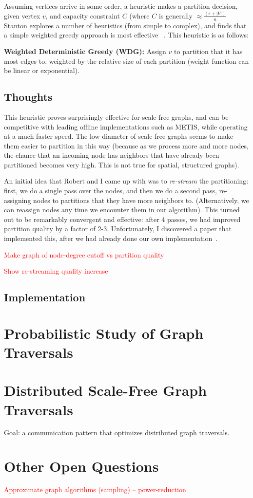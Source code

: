 \documentclass[11pt]{article}
\newcommand\warning[1]{\textcolor{red}{#1}}
\begin{document}
Assuming vertices arrive in some order, a heuristic makes a partition decision, given vertex $v$, and capacity constraint $C$ (where $C$ is generally $\approx \frac{(\epsilon+|V|)}{n}$ Stanton explores a number of heuristics (from simple to complex), and finds that a simple weighted greedy approach is most effective ~\cite{Stanton:2012:SGP:2339530.2339722}. This heuristic is as follows:

\textbf{Weighted Deterministic Greedy (WDG):} Assign $v$ to partition that it has most edges to, weighted by the relative size of each partition (weight function can be linear or exponential).

\subsection{Thoughts}
This heuristic proves surprisingly effective for scale-free graphs, and can be competitive with leading offline implementations such as METIS, while operating at a much faster speed. The low diameter of scale-free graphs seems to make them easier to partition in this way (because as we process more and more nodes, the chance that an incoming node has neighbors that have already been partitioned becomes very high. This is not true for spatial, structured graphs). 

An initial idea that Robert and I came up with was to \textit{re-stream} the partitioning: first, we do a single pass over the nodes, and then we do a second pass, re-assigning nodes to partitions that they have more neighbors to. (Alternatively, we can reassign nodes any time we encounter them in our algorithm). This turned out to be remarkably convergent and effective: after 4 passes, we had improved partition quality by a factor of 2-3. Unfortunately, I discovered a paper that implemented this, after we had already done our own implementation~\cite{Nishiura13}.

\warning{Make graph of node-degree cutoff vs partition quality}

\warning{Show re-streaming quality increase}

\subsection{Implementation}

\section{Probabilistic Study of Graph Traversals}


\section{Distributed Scale-Free Graph Traversals}
Goal: a communication pattern that optimizes distributed graph traversals.

\section{Other Open Questions}

\warning{Approximate graph algorithms (sampling) -- power-reduction}






\end{document}
